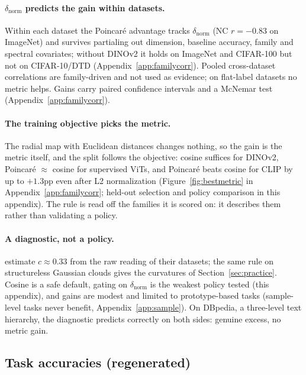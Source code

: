 \paragraph{$\delta_{\text{norm}}$ predicts the gain within datasets.} Within each dataset the Poincar\'{e} advantage tracks $\delta_{\text{norm}}$ (NC $r=-0.83$ on ImageNet) and survives partialing out dimension, baseline accuracy, family and spectral covariates; without DINOv2 it holds on ImageNet and CIFAR-100 but not on CIFAR-10/DTD (Appendix~\ref{app:familycorr}). Pooled cross-dataset correlations are family-driven and not used as evidence; on flat-label datasets no metric helps. Gains carry paired confidence intervals and a McNemar test (Appendix~\ref{app:familycorr}). %

\paragraph{The training objective picks the metric.} The radial map with Euclidean distances changes nothing, so the gain is the metric itself, and the split follows the objective: cosine suffices for DINOv2, Poincar\'{e} $\approx$ cosine for supervised ViTs, and Poincar\'{e} beats cosine for CLIP by up to $+1.3$pp even after L2 normalization (Figure~\ref{fig:bestmetric} in Appendix~\ref{app:familycorr}; held-out selection and policy comparison in this appendix). The rule is read off the families it is scored on: it describes them rather than validating a policy. %

\paragraph{A diagnostic, not a policy.} \citet{Khrulkov_2020_CVPR} estimate $c\approx0.33$ from the raw reading of their datasets; the same rule on structureless Gaussian clouds gives the curvatures of Section~\ref{sec:practice}. Cosine is a safe default, gating on $\delta_{\text{norm}}$ is the weakest policy tested (this appendix), and gains are modest and limited to prototype-based tasks (sample-level tasks never benefit, Appendix~\ref{app:sample}). On DBpedia, a three-level text hierarchy, the diagnostic predicts correctly on both sides: genuine excess, no metric gain. %
\FloatBarrier
\subsection{Task accuracies (regenerated)}


\FloatBarrier
